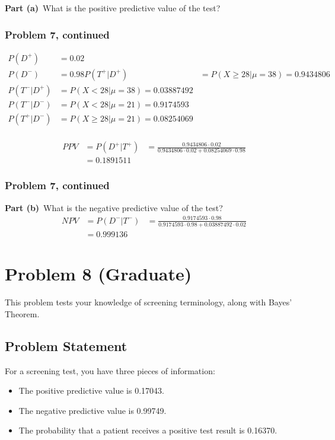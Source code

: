 \documentclass[12pt]{article}
\theoremstyle{definition}
\begin{document}
\bigskip
\noindent
{\bf Part (a)}\ What is the positive predictive value of the test?


\newpage
\subsubsection*{Problem 7, continued}
\begin{align*}
P(D^+) &= 0.02 \\
P(D^-) &= 0.98
P(T^+|D^+) &= P(X \geq 28|\mu = 38) = 0.9434806\\
P(T^-|D^+) &= P(X<28|\mu = 38) = 0.03887492\\
P(T^-|D^-) &= P(X<28|\mu = 21) = 0.9174593\\
P(T^+|D^-) &= P(X \geq 28|\mu = 21) = 0.08254069\\
\end{align*}

\begin{align*}
PPV &= P(D^+|T^+) &= \frac{0.9434806 \cdot 0.02}{0.9434806 \cdot 0.02 + 0.08254069 \cdot 0.98}\\
&= 0.1891511
\end{align*}

\newpage
\subsubsection*{Problem 7, continued}

\noindent
{\bf Part (b)}\ What is the negative predictive value of the test?
\begin{align*}
NPV &= P(D^-|T^-) &= \frac{0.9174593 \cdot 0.98}{0.9174593 \cdot 0.98 + 0.03887492 \cdot 0.02}\\
&= 0.999136
\end{align*}

\newpage
\section*{Problem 8 (Graduate)}

This problem tests your knowledge of screening terminology, along with Bayes' Theorem.

\subsection*{Problem Statement}

For a screening test, you have three pieces of information:
\begin{itemize}
	\item The positive predictive value is 0.17043.
	\item The negative predictive value is 0.99749.
	\item The probability that a patient receives a positive test result is 0.16370.
\end{itemize}
\end{document}
